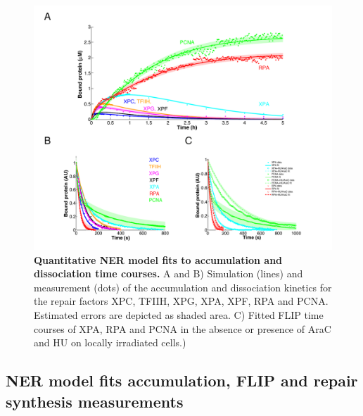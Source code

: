 \begin{figure}[htbp]
\begin{center}
\includegraphics[width=1\textwidth]{Abbildungen/figure2_6.pdf}
\caption{\textbf{Quantitative NER model fits to accumulation and dissociation time courses.} A and B) Simulation (lines) and measurement (dots) of the accumulation and dissociation kinetics for the repair factors XPC, TFIIH, XPG, XPA, XPF, RPA and PCNA. Estimated errors are depicted as shaded area. C) Fitted FLIP time courses of XPA, RPA and PCNA in the absence or presence of AraC and HU on locally irradiated cells.)}
\label{fig:ModelFit_accu_flip}
\end{center}
\end{figure}

\subsection{NER model fits accumulation, FLIP and repair synthesis measurements}    

